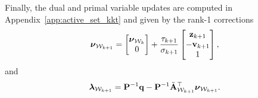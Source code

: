 Finally, the dual and primal variable updates are computed in Appendix~\ref{app:active_set_kkt} and given by the rank-1 corrections
\begin{equation}
	\label{eq:nu_update}
	\boldsymbol{\nu}_{\mathcal{W}_{k+1}}
	=
	\begin{bmatrix}
		\boldsymbol{\nu}_{\mathcal{W}_k} \\ 0
	\end{bmatrix}
	+
	\frac{\tau_{k+1}}{\sigma_{k+1}}
	\begin{bmatrix}
		\mathbf{z}_{k+1} \\ -\mathbf{v}_{k+1} \\ 1
	\end{bmatrix},
\end{equation}
and
\begin{equation}
	\label{eq:lambda_from_nu}
	\boldsymbol{\lambda}_{\mathcal{W}_{k+1}}
	=
	\mathbf{P}^{-1}\mathbf{q} - \mathbf{P}^{-1}\tilde{\mathbf{A}}_{\mathcal{W}_{k+1}}^\top\boldsymbol{\nu}_{\mathcal{W}_{k+1}}.
\end{equation}

